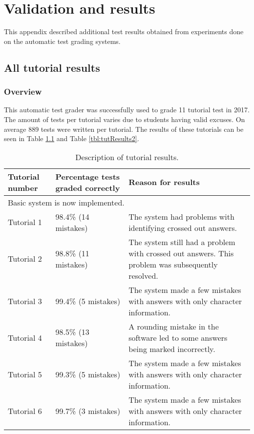 \chapter{Validation and results}
\label{ap:results}
\graphicspath{{Appendix5/Appendix5figures/}}

This appendix described additional test results obtained from experiments done on the automatic test grading systems.

\section{All tutorial results}
\label{sec:tutorialResults}

\subsection{Overview}

This automatic test grader was successfully used to grade 11 tutorial test in 2017. The amount of tests per tutorial varies due to students having valid excuses. On average 889 tests were written per tutorial. The results of these tutorials can be seen in Table \ref{tbl:tutResults} and Table \ref{tbl:tutResults2}.

\begin{table}
\caption{Description of tutorial results.} \label{tbl:tutResults}
  \centering
\begin{tabular}{|p{2cm}|p{4cm}|p{5cm}|}
\hline
\textbf{Tutorial number}&\textbf{Percentage tests graded correctly}&\textbf{Reason for results}\\
\hline
\multicolumn{3}{|l|}{Basic system is now implemented.}\\
\hline
Tutorial 1&98.4\% (14 mistakes)&The system had problems with identifying crossed out answers.\\
\hline
Tutorial 2&98.8\% (11 mistakes)&The system still had a problem with crossed out answers.  This problem was subsequently resolved.\\
\hline
Tutorial 3&99.4\% (5 mistakes)&The system made a few mistakes with answers with only character information.\\
\hline
Tutorial 4&98.5\% (13 mistakes)&A rounding mistake in the software led to some answers being marked incorrectly.\\
\hline
Tutorial 5&99.3\% (5 mistakes)&The system made a few mistakes with answers with only character information.\\
\hline
Tutorial 6&99.7\% (3 mistakes)&The system made a few mistakes with answers with only character information.\\
\hline
\end{tabular} 
\end{table}

